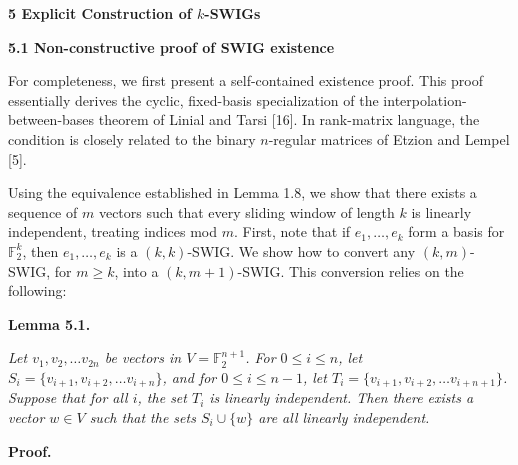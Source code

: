 \documentclass[10pt,a4paper]{article}
\begin{document}
\par\medskip\noindent\textbf{
5 Explicit Construction of $k$-SWIGs}\par




\par\medskip\noindent\textbf{
5.1 Non-constructive proof of SWIG existence}\par




For completeness, we first present a self-contained existence proof. This proof essentially derives the cyclic, fixed-basis specialization of the
interpolation-between-bases theorem of Linial and Tarsi [16]. In
rank-matrix language, the condition is closely related to the binary
$n$-regular matrices of Etzion and Lempel [5].\par




Using the equivalence established in Lemma 1.8, we show that there exists a sequence of $m$ vectors such that every sliding window of length $k$ is linearly independent, treating indices mod $m$. First, note that if $e_{1},\dots,e_{k}$ form a basis for $\mathbb{F}_{2}^{k}$, then $e_{1},\dots,e_{k}$ is a $(k,k)$-SWIG. We show how to convert any $(k,m)$-SWIG, for $m\geq k$, into a $(k,m+1)$-SWIG. This conversion relies on the following:\par





\par\medskip\noindent\textbf{
\textbf{Lemma 5.1}\textbf{.}
}\par



\emph{Let $v_{1},v_{2},\dots v_{2n}$ be vectors in $V=\mathbb{F}_{2}^{n+1}$. For $0\leq i\leq n$, let $S_{i}=\{v_{i+1},v_{i+2},\dots v_{i+n}\}$, and for $0\leq i\leq n-1$, let $T_{i}=\{v_{i+1},v_{i+2},\dots v_{i+n+1}\}$. Suppose that for all $i$, the set $T_{i}$ is linearly independent. Then there exists a vector $w\in V$ such that the sets $S_{i}\cup\{w\}$ are all linearly independent.}\par






\par\medskip\noindent\textbf{Proof.}\par
\end{document}
